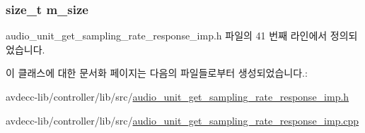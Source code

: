 \subsubsection[{\texorpdfstring{m\+\_\+size}{m_size}}]{\setlength{\rightskip}{0pt plus 5cm}size\+\_\+t m\+\_\+size\hspace{0.3cm}{\ttfamily [private]}}\hypertarget{classavdecc__lib_1_1audio__unit__get__sampling__rate__response__imp_a0dc3c363255f193681c77b4d2a82e995}{}\label{classavdecc__lib_1_1audio__unit__get__sampling__rate__response__imp_a0dc3c363255f193681c77b4d2a82e995}


audio\+\_\+unit\+\_\+get\+\_\+sampling\+\_\+rate\+\_\+response\+\_\+imp.\+h 파일의 41 번째 라인에서 정의되었습니다.



이 클래스에 대한 문서화 페이지는 다음의 파일들로부터 생성되었습니다.\+:\begin{DoxyCompactItemize}
\item 
avdecc-\/lib/controller/lib/src/\hyperlink{audio__unit__get__sampling__rate__response__imp_8h}{audio\+\_\+unit\+\_\+get\+\_\+sampling\+\_\+rate\+\_\+response\+\_\+imp.\+h}\item 
avdecc-\/lib/controller/lib/src/\hyperlink{audio__unit__get__sampling__rate__response__imp_8cpp}{audio\+\_\+unit\+\_\+get\+\_\+sampling\+\_\+rate\+\_\+response\+\_\+imp.\+cpp}\end{DoxyCompactItemize}
